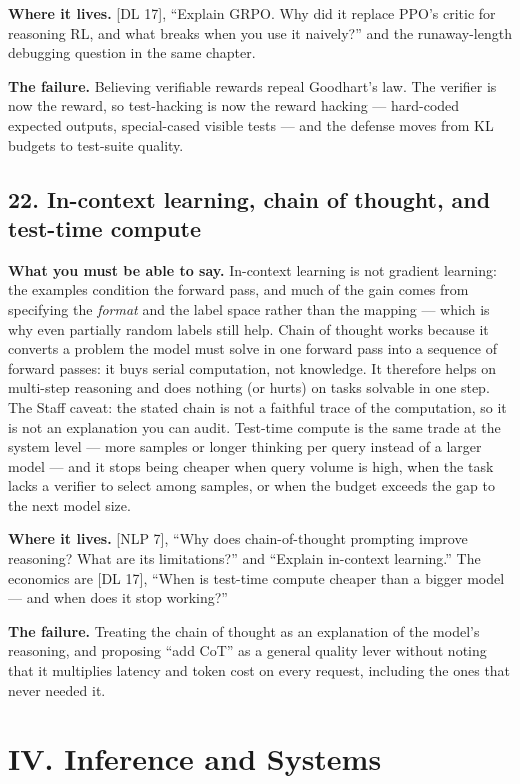 \textbf{Where it lives.} [DL 17], ``Explain GRPO. Why did it replace PPO's critic for reasoning RL, and what breaks when you use it naively?'' and the runaway-length debugging question in the same chapter.

\textbf{The failure.} Believing verifiable rewards repeal Goodhart's law. The verifier is now the reward, so test-hacking is now the reward hacking --- hard-coded expected outputs, special-cased visible tests --- and the defense moves from KL budgets to test-suite quality.

\subsection*{22. In-context learning, chain of thought, and test-time compute}

\textbf{What you must be able to say.} In-context learning is not gradient learning: the examples condition the forward pass, and much of the gain comes from specifying the \emph{format} and the label space rather than the mapping --- which is why even partially random labels still help. Chain of thought works because it converts a problem the model must solve in one forward pass into a sequence of forward passes: it buys serial computation, not knowledge. It therefore helps on multi-step reasoning and does nothing (or hurts) on tasks solvable in one step. The Staff caveat: the stated chain is not a faithful trace of the computation, so it is not an explanation you can audit. Test-time compute is the same trade at the system level --- more samples or longer thinking per query instead of a larger model --- and it stops being cheaper when query volume is high, when the task lacks a verifier to select among samples, or when the budget exceeds the gap to the next model size.

\textbf{Where it lives.} [NLP 7], ``Why does chain-of-thought prompting improve reasoning? What are its limitations?'' and ``Explain in-context learning.'' The economics are [DL 17], ``When is test-time compute cheaper than a bigger model --- and when does it stop working?''

\textbf{The failure.} Treating the chain of thought as an explanation of the model's reasoning, and proposing ``add CoT'' as a general quality lever without noting that it multiplies latency and token cost on every request, including the ones that never needed it.

\section*{IV. Inference and Systems}

